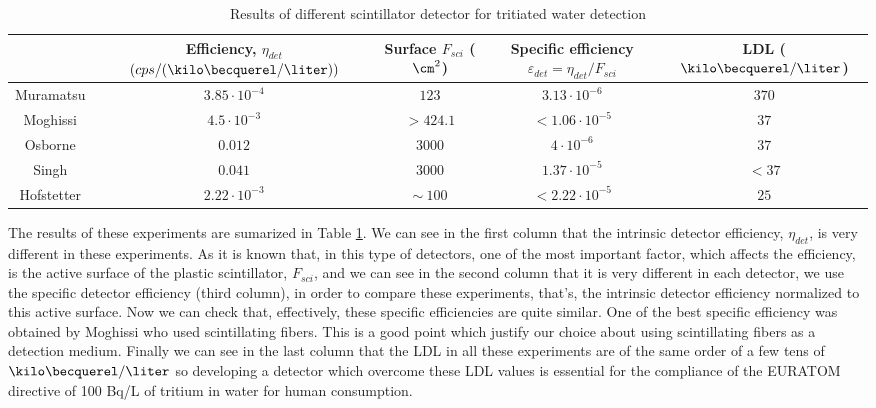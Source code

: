 \begin{table}[htbp]
\begin{center}
\begin{tabular}{|c|c|c|c|c|}
\hline
 & \parbox{6em}{\centering Efficiency, $\eta_{det}$\\ $(cps/(\kilo\becquerel/\liter))$}  & \parbox{5em}{\centering Surface\\ $F_{sci}$ ($\cm^2$)}  & \parbox{5em}{\centering Specific efficiency\\ $\varepsilon_{det}=\eta_{det}/F_{sci}$} & LDL ($\kilo\becquerel/\liter$)\\
\hline \hline \hline
Muramatsu & $3.85 \cdot 10^{-4}$ & $123$ & $3.13 \cdot 10^{-6}$ & $370$ \\ \hline
Moghissi & $4.5 \cdot 10^{-3}$ & $>424.1$ & $<1.06 \cdot 10^{-5}$ & $37$ \\ \hline
Osborne & $0.012$ & $3000$ & $4 \cdot 10^{-6}$ & $37$ \\ \hline
Singh & $0.041$ & $3000$ & $1.37 \cdot 10^{-5}$ & $<37$ \\ \hline
Hofstetter & $2.22 \cdot 10^{-3}$ & $\sim~100$ & $<2.22 \cdot 10^{-5}$ & $25$ \\ \hline
\end{tabular}
\caption{Results of different scintillator detector for tritiated water detection}
\label{tab:PlasticScinTritium}
\end{center}
\end{table}


The results of these experiments are sumarized in Table \ref{tab:PlasticScinTritium}. We can see in the first column that the intrinsic detector efficiency, $\eta_{det}$, is very different in these experiments. As it is known that, in this type of detectors, one of the most important factor, which affects the efficiency, is the active surface of the plastic scintillator, $F_{sci}$, and we can see in the second column that it is very different in each detector, we use the specific detector efficiency (third column), in order to compare these experiments, that's, the intrinsic detector efficiency normalized to this active surface. Now we can check that, effectively, these specific efficiencies are quite similar. One of the best specific efficiency was obtained by Moghissi who used scintillating fibers. This is a good point which justify our choice about using scintillating fibers as a detection medium. Finally we can see in the last column that the LDL in all these experiments are of the same order of a few tens of $\kilo\becquerel/\liter$ so developing a detector which overcome these LDL values is essential for the compliance of the EURATOM directive of 100 Bq/L of tritium in water for human consumption.
